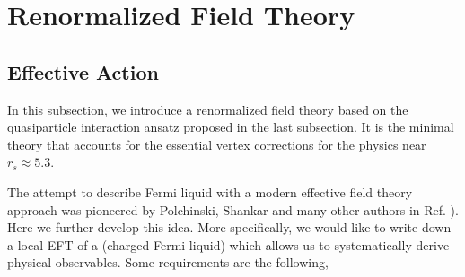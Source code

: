 \documentclass[reprint,amsmath,amssymb,aps,prb]{revtex4-1}
\begin{document}

\section{Renormalized Field Theory}
\subsection{Effective Action}

In this subsection, we introduce a renormalized field theory based on the quasiparticle interaction ansatz proposed in the last subsection. It is the minimal theory that accounts for the essential vertex corrections for the physics near $r_s\approx 5.3$.

The attempt to describe Fermi liquid with a modern effective field theory approach was pioneered by Polchinski, Shankar and many other authors in Ref. \cite{polchinski1992effective, shankarRG, hewsonRG, dupuisRG,ChitovRG}). Here we further develop this idea. More specifically, we would like to write down a local EFT of a (charged Fermi liquid) which allows us to systematically derive physical observables. Some requirements are the following,
\end{document}
